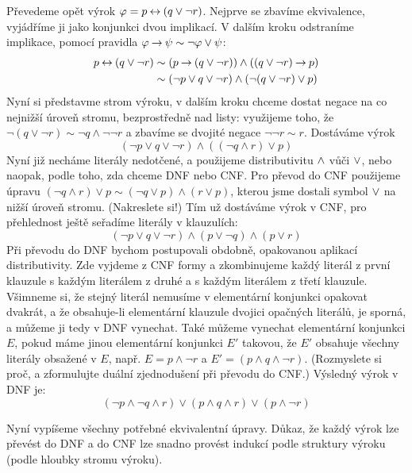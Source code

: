 \begin{example}
    Převedeme opět výrok $\varphi=p\mathbin{\leftrightarrow} (q\lor \neg r)$. Nejprve se zbavíme ekvivalence, vyjádříme ji jako konjunkci dvou implikací. V dalším kroku odstraníme implikace, pomocí pravidla $\varphi\mathbin{\rightarrow}\psi\sim\neg\varphi\lor\psi$:
    \begin{align*}
        p\mathbin{\leftrightarrow} (q\lor \neg r) &\sim (p\mathbin{\rightarrow} (q\lor \neg r)) \land ((q\lor \neg r) \mathbin{\rightarrow} p)\\
        &\sim (\neg p\lor q\lor \neg r) \land (\neg (q\lor \neg r) \lor p)
    \end{align*}
    Nyní si představme strom výroku, v dalším kroku chceme dostat negace na co nejnižší úroveň stromu, bezprostředně nad listy: využijeme toho, že $\neg (q\lor \neg r)\sim \neg q\land \neg\neg r$ a zbavíme se dvojité negace $\neg\neg r\sim r$. Dostáváme výrok 
    $$
    (\neg p\lor q\lor \neg r) \land ( (\neg q\land r) \lor p)
    $$
    Nyní již necháme literály nedotčené, a použijeme distributivitu ${\land}$ vůči ${\lor}$, nebo naopak, podle toho, zda chceme DNF nebo CNF. Pro převod do CNF použijeme úpravu $(\neg q\land r) \lor p\sim (\neg q\lor p)\land (r \lor p) $, kterou jsme dostali symbol ${\lor}$ na nižší úroveň stromu. (Nakreslete si!) Tím už dostáváme výrok v CNF, pro přehlednost ještě seřadíme literály v klauzulích:
    $$
    (\neg p\lor q\lor \neg r) \land (p\lor \neg q) \land (p \lor r) 
    $$
    Při převodu do DNF bychom postupovali obdobně, opakovanou aplikací distributivity. Zde vyjdeme z CNF formy a zkombinujeme každý literál z první klauzule s každým literálem z druhé a s každým literálem z třetí klauzule. Všimneme si, že stejný literál nemusíme v elementární konjunkci opakovat dvakrát, a že obsahuje-li elementární klauzule dvojici opačných literálů, je sporná, a můžeme ji tedy v DNF vynechat. Také můžeme vynechat elementární konjunkci $E$, pokud máme jinou elementární konjunkci $E'$ takovou, že $E'$ obsahuje všechny literály obsažené v $E$, např. $E=p\land \neg r$ a $E'=(p\land q \land \neg r)$. (Rozmyslete si proč, a zformulujte duální zjednodušení při převodu do CNF.) Výsledný výrok v DNF je:
    $$
    (\neg p \land \neg q\land r) \lor (p\land q \land r) \lor (p\land \neg r)
    $$
\end{example}

Nyní vypíšeme všechny potřebné ekvivalentní úpravy. Důkaz, že každý výrok lze převést do DNF a do CNF lze snadno provést indukcí podle struktury výroku (podle hloubky stromu výroku).

